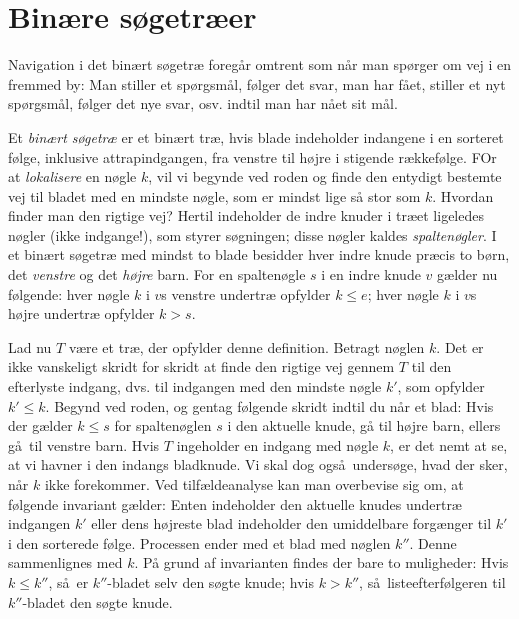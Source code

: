 \section{Binære søgetræer}%
%
%

Navigation i det binært søgetræ foregår omtrent som når man spørger om vej i en fremmed by:
Man stiller et spørgsmål, følger det svar, man har fået, stiller et nyt spørgsmål, følger det nye svar, osv. indtil man har nået sit mål.

Et \emph{binært søgetræ} er et binært træ, hvis blade indeholder indangene i en sorteret følge, inklusive attrapindgangen, fra venstre til højre i stigende rækkefølge.
FOr at \emph{lokalisere} en nøgle $k$,
vil vi begynde ved roden og finde den entydigt bestemte vej til bladet med en mindste nøgle, som er mindst lige så stor som $k$.
Hvordan finder man den rigtige vej?
Hertil indeholder de indre knuder i træet ligeledes nøgler (ikke indgange!), som styrer søgningen;
disse nøgler kaldes \emph{spaltenøgler}.
I et binært søgetræ med mindst to blade besidder hver indre knude præcis to børn, det \emph{venstre} og det \emph{højre} barn.
For en spaltenøgle $s$ i en indre knude $v$ gælder nu følgende:
hver nøgle $k$ i $v$s venstre undertræ opfylder $k\le e$;
hver nøgle $k$ i $v$s højre undertræ opfylder $k>s$.

Lad nu $T$ være et træ, der opfylder denne definition.
Betragt nøglen $k$.
Det er ikke vanskeligt skridt for skridt at finde den rigtige vej gennem $T$ til den efterlyste indgang, dvs. til indgangen med den mindste nøgle $k'$, som opfylder $k'\leq k$.
Begynd ved roden, og gentag følgende skridt indtil du når et blad:
Hvis  der gælder $k\le s$ for spaltenøglen $s$ i den aktuelle knude, gå til højre barn, ellers gå til venstre barn.
Hvis $T$ ingeholder en indgang med nøgle $k$, er det nemt at se, at vi havner i den indangs bladknude.
Vi skal dog også undersøge, hvad der sker, når $k$ ikke forekommer.
Ved tilfældeanalyse 
kan man overbevise sig om, at følgende invariant
gælder:
Enten indeholder den aktuelle knudes undertræ indgangen $k'$ eller dens højreste blad indeholder den umiddelbare forgænger til $k'$ i den sorterede følge.
Processen ender med et blad med nøglen $k''$.
Denne sammenlignes med $k$.
På grund af invarianten findes der bare to muligheder:
Hvis $k\le k''$, så er $k''$-bladet selv den søgte knude;
hvis $k > k''$, så listeefterfølgeren til $k''$-bladet den søgte knude.  
   
